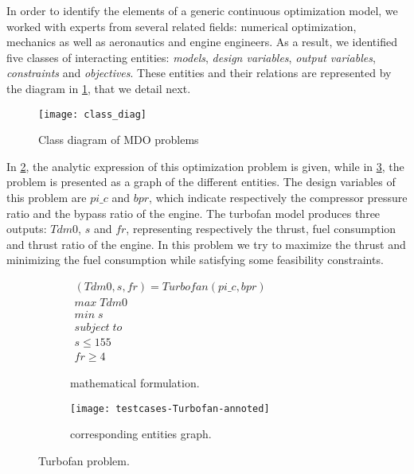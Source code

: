 In order to identify the elements of a generic continuous optimization model, we worked with experts from several related fields: numerical optimization, mechanics as well as aeronautics and engine engineers. As a result, we identified five classes of interacting entities: \emph{models}, \emph{design variables}, \emph{output variables}, \emph{constraints} and \emph{objectives}. These entities and their relations are represented by the diagram in \figurename{} \ref{class_diag}, that we detail next.

\begin{figure}[t]
	\centering
	\texttt{[image: class\_diag]}
	\caption{Class diagram of MDO problems}
	\label{class_diag}
\end{figure}

In \figurename{} \ref{turbofan:math}, the analytic expression of this optimization problem is given, while in \figurename{} \ref{turbofan:graph}, the problem is presented as a graph of the different entities. The design variables of this problem are $pi\_c$ and $bpr$, which indicate respectively the compressor pressure ratio and the bypass ratio of the engine. The turbofan model produces three outputs: $Tdm0$, $s$ and $fr$, representing respectively the thrust, fuel consumption and thrust ratio of the engine. In this problem we try to maximize the thrust and minimizing the fuel consumption while satisfying some feasibility constraints. 

\begin{figure}[]
\centering
	\begin{subfigure}[b]{0.4\textwidth}
		$\begin{array}{c}
			(Tdm0, s, fr) = Turbofan(pi\_c, bpr) \\
			max \; Tdm0 \\
			min \; s \\
			subject \; to \\
			s \leq 155 \\
			fr \geq 4
		\end{array}$
		\caption{mathematical formulation.}\label{turbofan:math}
	\end{subfigure}
	\hfill%
	\begin{subfigure}[b]{0.55\textwidth}
			\centering
			\texttt{[image: testcases-Turbofan-annoted]}
			\caption{corresponding entities graph.}\label{turbofan:graph}
	\end{subfigure}

\caption{Turbofan problem.}
\label{turbofan}

\end{figure}

